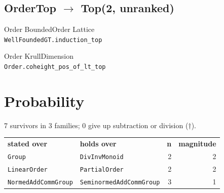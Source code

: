 \documentclass[10pt,a4paper]{article}
\begin{document}
\subsection*{OrderTop $\to$ Top\quad\textmd{\small (2, unranked)}}
{\footnotesize\color{locator}Order\,\textperiodcentered\,BoundedOrder\,\textperiodcentered\,Lattice}\\
\hspace*{1em}\texttt{\small WellFoundedGT.\allowbreak{}induction\_top}\\

{\footnotesize\color{locator}Order\,\textperiodcentered\,KrullDimension}\\
\hspace*{1em}\texttt{\small Order.\allowbreak{}coheight\_pos\_of\_lt\_top}\\

\bigskip
\section{Probability}
7 survivors in 3 families; 0 give up subtraction or division ($\dagger$).

\begin{center}
\begin{tabular}{llrr}
\textbf{stated over} & \textbf{holds over} & \textbf{n} & \textbf{magnitude}\\[2pt]
\texttt{\small Group} & \texttt{\small DivInvMonoid} & 2 & 2\\
\texttt{\small LinearOrder} & \texttt{\small PartialOrder} & 2 & 2\\
\texttt{\small NormedAddCommGroup} & \texttt{\small SeminormedAddCommGroup} & 3 & 1\\
\end{tabular}
\end{center}
\end{document}
